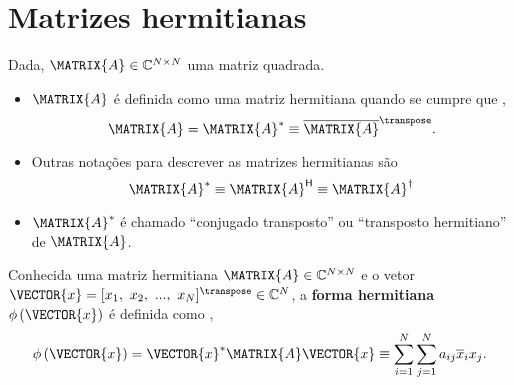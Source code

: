 \section{ Matrizes hermitianas}


\begin{definition}\label{def:hermitianamatrix0}
Dada, $\MATRIX{A} \in \mathbb{C}^{N \times N}$ uma matriz quadrada. 
\begin{itemize}
\item $\MATRIX{A}$ é definida como uma matriz hermitiana quando se cumpre que 
\cite[pp. 12]{pillai2008space} \cite[pp. 411]{korn2013mathematical}, 
\begin{equation}
\MATRIX{A} = \MATRIX{A}^{\ast} \equiv \overline{\MATRIX{A}}^{\transpose}.
\end{equation}
\item Outras notações para descrever as matrizes hermitianas são 
\begin{equation}
\MATRIX{A}^{\ast} \equiv \MATRIX{A}^{\mathsf{H}}\equiv \MATRIX{A}^{\dagger} 
\end{equation}
\end{itemize}
\end{definition}

\begin{tcbattention}
\begin{itemize}
\item $\MATRIX{A}^{\ast}$ é chamado ``conjugado transposto'' ou ``transposto hermitiano'' de $\MATRIX{A}$.
\end{itemize}
\end{tcbattention}

\begin{definition}\label{def:formhermitiana0}
Conhecida uma matriz hermitiana $\MATRIX{A}\in \mathbb{C}^{N \times N}$ e 
o vetor $\VECTOR{x}=[x_1,~x_2,~...,~x_N]^{\transpose}\in \mathbb{C}^{N}$,
a \textbf{forma hermitiana} $\phi\left(\VECTOR{x}\right)$ é definida como
\cite[pp. 386]{mirsky2012introduction} \cite[pp. 339]{datta2016matrix}, 
\begin{equation}
\phi\left(\VECTOR{x}\right) = 
\VECTOR{x}^{\ast}\MATRIX{A}\VECTOR{x} \equiv 
\sum_{i=1}^{N} \sum_{j=1}^{N} a_{ij}\overline{x}_i x_j.
\end{equation}
\end{definition}

